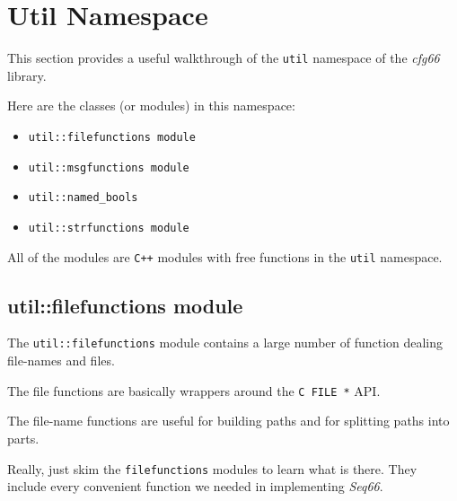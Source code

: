 %
%
%

\section{Util Namespace}
\label{sec:util_namespace}

   This section provides a useful walkthrough of the \texttt{util} namespace of
   the \textsl{cfg66} library.

   Here are the classes (or modules) in this namespace:

   \begin{itemize}
      \item \texttt{util::filefunctions module}
      \item \texttt{util::msgfunctions module}
      \item \texttt{util::named\_bools}
      \item \texttt{util::strfunctions module}
   \end{itemize}

   All of the modules are \texttt{C++} modules with free functions
   in the \texttt{util} namespace.

\subsection{util::filefunctions module}
\label{subsec:util_namespace_filefunctions}

   The \texttt{util::filefunctions} module contains a large number of
   function dealing file-names and files.

   The file functions are basically wrappers around the \texttt{C FILE *}
   API.

   The file-name functions are useful for building paths and for splitting
   paths into parts.

   Really, just skim the \texttt{filefunctions} modules to learn what is
   there.  They include every convenient function we needed in implementing
   \textsl{Seq66}.

